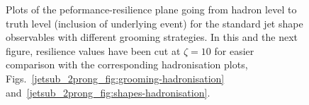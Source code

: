 \documentclass[11pt]{cernrep}
\begin{document}
\begin{figure}
  \caption{Plots of the peformance-resilience plane going from hadron
    level to truth level (inclusion of underlying event) for the
    standard jet shape observables with different grooming strategies.
    In this and the next figure, resilience values have been cut at
    $\zeta=10$ for easier comparison with the corresponding
    hadronisation plots,
    Figs.~\ref{jetsub_2prong_fig:grooming-hadronisation}
    and~\ref{jetsub_2prong_fig:shapes-hadronisation}.}\label{jetsub_2prong_fig:grooming-UE}
\end{figure}
\end{document}
